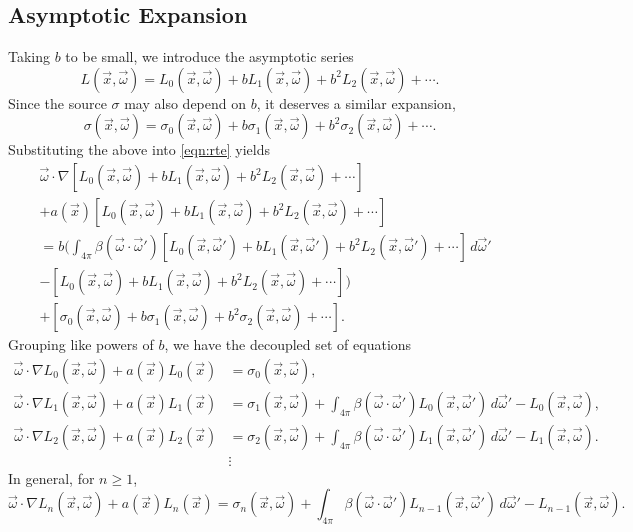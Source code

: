 \subsection{Asymptotic Expansion}
Taking $b$ to be small, we introduce the asymptotic series
\newcommand{\Lasym}{L_0(\vec{x},\vec{\omega}) + b L_1(\vec{x},\vec{\omega}) + b^2 L_2(\vec{x},\vec{\omega}) + \cdots}
\newcommand{\Lasyms}{L_0(\vec{x_s},\vec{\omega}) + b L_1(\vec{x_s},\vec{\omega}) + b^2 L_2(\vec{x_s},\vec{\omega}) + \cdots}
\newcommand{\Lasymb}{L_0(\vec{x_b},\vec{\omega}) + b L_1(\vec{x_b},\vec{\omega}) + b^2 L_2(\vec{x_b},\vec{\omega}) + \cdots}
\newcommand{\Lasymp}{L_0(\vec{x},\vec{\omega}') + b L_1(\vec{x},\vec{\omega}') + b^2 L_2(\vec{x},\vec{\omega}') + \cdots}
\newcommand{\sigasym}{\sigma_0(\vec{x},\vec{\omega}) + b \sigma_1(\vec{x},\vec{\omega}) + b^2 \sigma_2(\vec{x},\vec{\omega}) + \cdots}
\begin{equation*}
  \label{eqn:Lasym}
  L(\vec{x},\vec{\omega}) = \Lasym.
\end{equation*}
Since the source $\sigma$ may also depend on $b$, it deserves a similar expansion,
\begin{equation*}
  \label{eqn:sigasym}
  \sigma(\vec{x},\vec{\omega}) = \sigasym.
\end{equation*}
Substituting the above into \eqref{eqn:rte} yields
\begin{align*}
    &\vec{\omega} \cdot \nabla \left[ \Lasym \right] \\
    &+ a(\vec{x}) \left[ \Lasym \right] \\
    &= b\Bigg(
      \int_{4\pi} \beta(\vec{\omega}\cdot\vec{\omega}')
      \left[ \Lasymp \right] \, d\vec{\omega}' \\
    &- \left[ \Lasym \right]
      \Bigg) \\
    &+ \left[ \sigasym \right].
\end{align*}
Grouping like powers of $b$, we have the decoupled set of equations
\begin{align}
  \vec{\omega} \cdot \nabla L_0(\vec{x}, \vec{\omega}) + a(\vec{x})L_0(\vec{x}) &= \sigma_0(\vec{x}, \vec{\omega}),
  \label{eqn:asymptotics_0}\\
  \vec{\omega} \cdot \nabla L_1(\vec{x}, \vec{\omega}) + a(\vec{x})L_1(\vec{x})
  &= \sigma_1(\vec{x}, \vec{\omega})
  + \int_{4\pi} \beta(\vec{\omega}\cdot\vec{\omega}') L_0(\vec{x}, \vec{\omega}')\,d\vec{\omega}' - L_0(\vec{x}, \vec{\omega}), \nonumber\\
  \vec{\omega} \cdot \nabla L_2(\vec{x}, \vec{\omega}) + a(\vec{x})L_2(\vec{x})
  &= \sigma_2(\vec{x}, \vec{\omega})
  + \int_{4\pi} \beta(\vec{\omega}\cdot\vec{\omega}') L_1(\vec{x}, \vec{\omega}')\,d\vec{\omega}' - L_1(\vec{x}, \vec{\omega}). \nonumber \\
  &\vdots \nonumber
\end{align}
In general, for $n \geq 1$,
\begin{equation}
  \vec{\omega} \cdot \nabla L_n(\vec{x}, \vec{\omega}) + a(\vec{x})L_n(\vec{x})
  = \sigma_n(\vec{x}, \vec{\omega})
  + \int_{4\pi} \beta(\vec{\omega}\cdot\vec{\omega}') L_{n-1}(\vec{x}, \vec{\omega}')\,d\vec{\omega}' - L_{n-1}(\vec{x}, \vec{\omega}).
  \label{eqn:asymptotics_n}
\end{equation}

